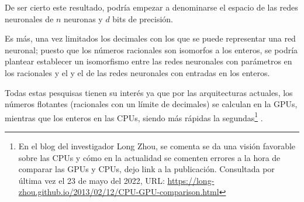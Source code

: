 De ser cierto este resultado, podría empezar a denominarse el espacio 
de las redes neuronales de $n$  neuronas y $d$ bits de precisión. 

Es más, una vez limitados los decimales con los que se puede representar una red neuronal; puesto que los números racionales son isomorfos a los enteros, se podría plantear establecer un isomorfismo entre las redes neuronales con parámetros
en los racionales y el 
y el de las redes neuronales con entradas en los enteros. 

Todas estas pesquisas tienen su interés ya que por las arquitecturas 
actuales, los números flotantes (racionales con un límite de decimales) se calculan en la GPUs, mientras que los enteros en las CPUs, siendo más rápidas la segundas\footnote{En el blog del investigador Long Zhou, se comenta se da una visión favorable sobre las CPUs y cómo en la actualidad se comenten errores a la hora de comparar las GPUs y CPUs, dejo link a la publicación. Consultada por última vez el 23 de mayo
del 2022, URL: \url{https://long-zhou.github.io/2013/02/12/CPU-GPU-comparison.html}} \cite{CPU-vs-GPUS}. 

